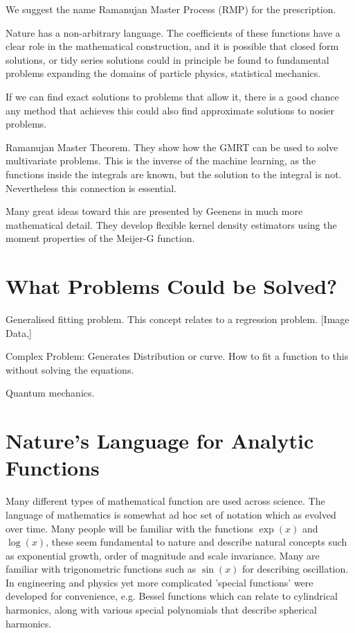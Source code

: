 \documentclass[journal=jcisd8,manuscript=article,layout=onecolumn,pdftex,floatfix,amsmath,amssymb,10pt]{achemso}
\begin{document}
{\color{red} We suggest the name Ramanujan Master Process (RMP) for the prescription.

Nature has a non-arbitrary language. The coefficients of these functions have a clear role in the mathematical construction, and it is possible that closed form solutions, or tidy series solutions could in principle be found to fundamental problems expanding the domains of particle physics, statistical mechanics.

If we can find exact solutions to problems that allow it, there is a good chance any method that achieves this could also find approximate solutions to nosier problems.

Ramanujan Master Theorem. \citep{Gonzalez2015}
They show how the GMRT can be used to solve multivariate problems. This is the inverse of the machine learning, as the functions inside the integrals are known, but the solution to the integral is not. Nevertheless this connection is essential.

Many great ideas toward this are presented by Geenens \citep{Geenens} in much more mathematical detail. They develop flexible kernel density estimators using the moment properties of the Meijer-G function.

}

\section{What Problems Could be Solved?}
Generalised fitting problem.
This concept relates to a regression problem.
[Image Data,]

Complex Problem: Generates Distribution or curve. How to fit a function to this without solving the equations.

Quantum mechanics.


\section{Nature's Language for Analytic Functions}
Many different types of mathematical function are used across science. The language of mathematics is somewhat ad hoc set of notation which as evolved over time. Many people will be familiar with the functions $\exp(x)$ and $\log(x)$, these seem fundamental to nature and describe natural concepts such as exponential growth, order of magnitude and scale invariance. Many are familiar with trigonometric functions such as $\sin(x)$ for describing oscillation. In engineering and physics yet more complicated 'special functions' were developed for convenience, e.g. Bessel functions which can relate to cylindrical harmonics, along with various special polynomials that describe spherical harmonics.
\end{document}
